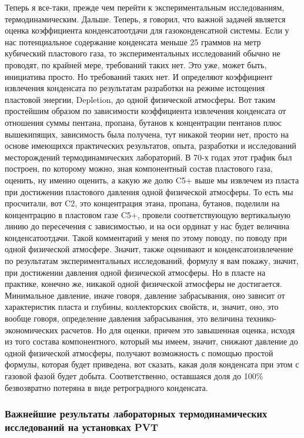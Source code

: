 \documentclass[main.tex]{subfiles}
\begin{document}
Теперь я все-таки, прежде чем перейти к экспериментальным исследованиям, термодинамическим.
Дальше. Теперь, я говорил, что важной задачей является оценка коэффициента конденсатоотдачи для газоконденсатной системы.
Если у нас потенциальное содержание конденсата меньше 25 граммов на метр кубический пластового газа, то экспериментальных исследований обычно не проводят, по крайней мере, требований таких нет.
Это уже, может быть, инициатива просто.
Но требований таких нет.
И определяют коэффициент извлечения конденсата по результатам разработки на режиме истощения пластовой энергии, Depletion, до одной физической атмосферы.
Вот таким простейшим образом по зависимости коэффициента извлечения конденсата от отношения суммы пентана, пропана, бутанов к концентрации пентанов плюс вышекипящих, зависимость была получена, тут никакой теории нет, просто на основе имеющихся практических результатов, опыта, разработки и исследований месторождений термодинамических лабораторий.
В 70-х годах этот график был построен, по которому можно, зная компонентный состав пластового газа, оценить, ну именно оценить, а какую же долю C5+ выше мы извлечем из пласта при достижении пластового давления одной физической атмосферы.
То есть мы просчитали, вот C2, это концентрация этана, пропана, бутанов, поделили на концентрацию в пластовом газе C5+, провели соответствующую вертикальную линию до пересечения с зависимостью, и на оси ординат у нас будет величина конденсатоотдачи.
Такой комментарий у меня по этому поводу, по поводу при одной физической атмосфере.
Значит, также оценивают и конденсатоизвлечение по результатам экспериментальных исследований, формулу я вам покажу, значит, при достижении давления одной физической атмосферы.
Но в пласте на практике, конечно же, никакой одной физической атмосферы не достигается.
Минимальное давление, иначе говоря, давление забрасывания, оно зависит от характеристик пласта и глубины, коллекторских свойств, и, значит, оно, это вообще говоря, определение давления забрасывания, это величина технико-экономических расчетов.
Но для оценки, причем это завышенная оценка, исходя из того состава компонентного, который мы имеем, значит, снижают давление до одной физической атмосферы, получают возможность с помощью простой формулы, которая будет приведена, вот сказать, какая доля конденсата при этом с газовой фазой будет добыта.
Соответственно, оставшаяся доля до 100\% безвозвратно потеряна в виде ретроградного конденсата.

\subsubsection{Важнейшие результаты лабораторных термодинамических исследований на установках PVT}
\end{document}
